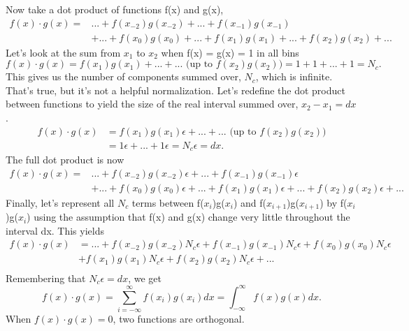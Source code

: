 \documentclass[12pt]{article}
\begin{document}
Now take a dot product of functions f(x) and g(x), 
\begin{equation}
\begin{split}
f(x) \cdot g(x) = & ... + f(x_{-2})g(x_{-2}) + ... + f(x_{-1})g(x_{-1}) \\ 
&+ ... + f(x_0)g(x_0) + ... + f(x_1)g(x_1) + ... + f(x_2)g(x_2) + ...
\end{split}
\end{equation}
Let's look at the sum from $x_1$ to $x_{2}$ when f(x) = g(x) = 1 in all bins 
\begin{equation}
f(x) \cdot g(x) = f(x_1)g(x_1) + ... + ... \text{ (up to } f(x_2)g(x_2)) = 1 + 1 + ... + 1 = N_c.
\end{equation}
This gives us the number of components summed over, $N_c$, which is infinite. That's true, but it's not a helpful normalization. Let's redefine the dot product between functions to yield the size of the real interval summed over, $x_2 - x_1 = dx$. 
\begin{equation}
\begin{split}
f(x) \cdot g(x) &= f(x_1)g(x_1)\epsilon + ... + ... \text{ (up to } f(x_2)g(x_2)) \\ 
& = 1\epsilon + ... + 1\epsilon = N_c\epsilon = dx.
\end{split}
\end{equation}
The full dot product is now
\begin{equation}
\begin{split}
f(x) \cdot g(x) = &... + f(x_{-2})g(x_{-2})\epsilon + ... + f(x_{-1})g(x_{-1})\epsilon \\ 
&+ ... + f(x_0)g(x_0)\epsilon + ... + f(x_1)g(x_1)\epsilon + ... + f(x_2)g(x_2)\epsilon + ...
\end{split}
\end{equation}
Finally, let's represent all $N_c$ terms between f($x_i$)g($x_i$) and f($x_{i+1}$)g($x_{i+1}$) by f($x_i$)g($x_i$) using the assumption that f(x) and g(x) change very little throughout the interval dx. This yields 
\begin{equation}
\begin{split}
f(x) \cdot g(x) &= ... + f(x_{-2})g(x_{-2})N_c\epsilon + f(x_{-1})g(x_{-1})N_c\epsilon + f(x_0)g(x_0)N_c\epsilon \\ 
&+ f(x_1)g(x_1)N_c\epsilon + f(x_2)g(x_2)N_c\epsilon + ... \\ 
\end{split}
\end{equation}
Remembering that $N_c\epsilon = dx$, we get
\begin{equation}
f(x) \cdot g(x) = \sum_{i=-\infty}^{\infty} f(x_i)g(x_i) dx = \int_{-\infty}^{\infty} f(x)g(x)dx.
\end{equation}
When $f(x) \cdot g(x) = 0$, two functions are orthogonal.
\end{document}
